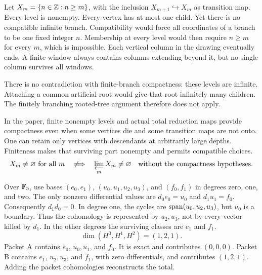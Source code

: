 Let $X_m=\{n\in\mathbb Z:n\ge m\}$, with the inclusion $X_{m+1}\hookrightarrow X_m$ as transition map. Every level is nonempty. Every vertex has at most one child. Yet there is no compatible infinite branch.
Compatibility would force all coordinates of a branch to be one fixed integer $n$. Membership at every level would then require $n\ge m$ for every $m$, which is impossible. Each vertical column in the drawing eventually ends. A finite window always contains columns extending beyond it, but no single column survives all windows.

There is no contradiction with finite-branch compactness: these levels are infinite. Attaching a common artificial root would give that root infinitely many children. The finitely branching rooted-tree argument therefore does not apply.

In the paper, finite nonempty levels and actual total reduction maps provide compactness even when some vertices die and some transition maps are not onto. One can retain only vertices with descendants at arbitrarily large depths. Finiteness makes that surviving part nonempty and permits compatible choices.
\[
X_m\ne\varnothing\ \text{for all }m
\quad\not\Longrightarrow\quad
\varprojlim_m X_m\ne\varnothing
\quad\text{without the compactness hypotheses.}
\]

Over $\mathbb F_5$, use bases $(e_0,e_1)$, $(u_0,u_1,u_2,u_3)$, and $(f_0,f_1)$ in degrees zero, one, and two. The only nonzero differential values are $d_0e_0=u_0$ and $d_1u_1=f_0$. Consequently $d_1d_0=0$.
In degree one, the cycles are $\operatorname{span}(u_0,u_2,u_3)$, but $u_0$ is a boundary. Thus the cohomology is represented by $u_2,u_3$, not by every vector killed by $d_1$. In the other degrees the surviving classes are $e_1$ and $f_1$.
\[
\dim(H^0,H^1,H^2)=(1,2,1).
\]
Packet A contains $e_0$, $u_0,u_1$, and $f_0$. It is exact and contributes $(0,0,0)$. Packet B contains $e_1$, $u_2,u_3$, and $f_1$, with zero differentials, and contributes $(1,2,1)$. Adding the packet cohomologies reconstructs the total.

